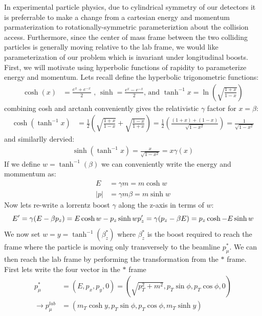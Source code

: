 In experimental particle physics, due to cylindrical symmetry of our detectors it is preferrable to make a change
from a cartesian energy and momentum parmaterization to  rotationally-symmetric parameteriztion about
the collision access. Furthermore, since the center of mass frame between the two colliding particles is generally moving
relative to the lab frame, we would like parameterization of our problem which is invariant under longitudinal boosts. First, 
we will motivate using hyperbolic functions of rapidity to parameterize energy and momentum. Lets recall define the hyperbolic
trigonometric functions:
\begin{align*}
\cosh(x) &= \frac{e^{x} + e^{-x}}{2} \texttt{ , } \sinh = \frac{e^{x} - e^{-x}}{2} \text{, and }\tanh^{-1}x = \ln \left( \sqrt{\frac{1+x}{1-x}} \right)
\end{align*}
combining cosh and arctanh conveniently gives the relativistic $\gamma$ factor for $x=\beta$:
\begin{align*}
\cosh{(\tanh^{-1}{x})} &= \frac{1}{2} \left ( \sqrt{\frac{1+x}{1-x}} + \sqrt{\frac{1-x}{1+x}} \right ) = \frac{1}{2} \left( \frac{(1+x) + (1 -x)}{\sqrt{1-x^2}} \right)  = \frac{1}{\sqrt{1-x^2}}
\end{align*}
and similarlly dervied:
\begin{align*}
\sinh{(\tanh^{-1}{x})} = \frac{x}{\sqrt{1-x^2}} = x \gamma(x)
\end{align*}
If we define $w = \tanh^{-1}(\beta)$ we can conveniently write the energy and mommentum as:
\begin{align*}
E &= \gamma m = m \cosh{w} \\
|p| &= \gamma m \beta  = m \sinh{w} 
\end{align*}
Now lets re-write a lorrentz boost $\gamma$ along the z-axis in terms of $w$:
\begin{equation} \label{eq:boost}
E' = \gamma (E - \beta p_z)   = E \cosh w - p_z \sinh w\\
p_z' = \gamma (p_z - \beta E) = p_z \cosh - E \sinh w
\end{equation}
We now set $w = y = \tanh^{-1}(\beta_z^*)$ where $\beta_z^*$ is the boost required to reach the frame where the particle is
moving only transversely to the beamline $p_\mu^*$. We can then reach the lab frame by performing
 the transformation from the $*$ frame. First lets write the four vector in the $*$ frame
\begin{align*}
 p_\mu^* &= ( E , p_x, p_y, 0 ) = (\sqrt{p_T^2 + m^2}, p_T\sin \phi, p_T \cos \phi, 0)\\
\rightarrow  p_\mu^{lab} &= (m_T \cosh y, p_T \sin \phi, p_T \cos \phi, m_T \sinh y)
\end{align*}
